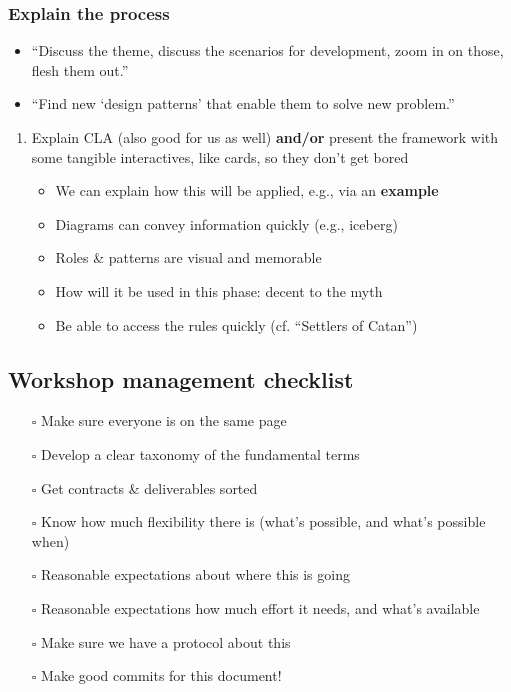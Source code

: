 \documentclass{article}
\begin{document}
\subsubsection{Explain the process}
\begin{itemize}
\item ``Discuss the theme, discuss the scenarios for development, zoom in on those, flesh them out.''
\item ``Find new ‘design patterns’ that enable them to solve new problem.''
\end{itemize}
\begin{enumerate}
\item Explain CLA (also good for us as well) \textbf{and/or} present the framework with some tangible interactives, like cards, so they don’t get bored
\begin{itemize}
\item We can explain how this will be applied, e.g., via an \textbf{example}
\item Diagrams can convey information quickly (e.g., iceberg)
\item Roles \& patterns are visual and memorable
\item How will it be used in this phase: decent to the myth
\item Be able to access the rules quickly (cf. ``Settlers of Catan'')
\end{itemize}
\end{enumerate}
\subsection{Workshop management checklist}
\label{e28fb669-45a6-4916-b56b-a3afd6238d4f}
\begin{itemize}
\item[{$\square$}] Make sure everyone is on the same page
\item[{$\square$}] Develop a clear taxonomy of the fundamental terms
\item[{$\square$}] Get contracts \& deliverables sorted
\item[{$\square$}] Know how much flexibility there is (what’s possible, and what’s possible when)
\item[{$\square$}] Reasonable expectations about where this is going
\item[{$\square$}] Reasonable expectations how much effort it needs, and what’s available
\item[{$\square$}] Make sure we have a protocol about this
\item[{$\square$}] Make good commits for this document!
\end{itemize}
\end{document}
